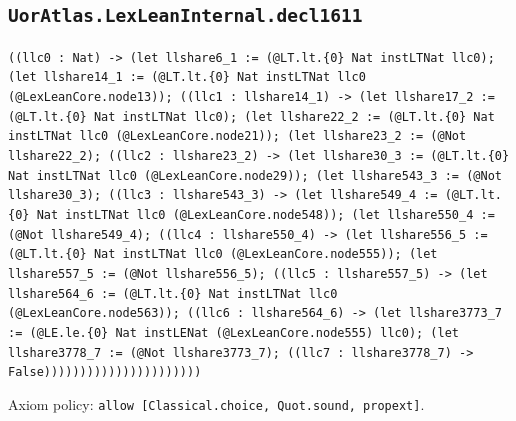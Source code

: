 \documentclass[11pt]{article}
\begin{document}
\subsection*{\texttt{UorAtlas.LexLeanInternal.decl1611}}
\noindent\texttt{((llc0 : Nat) -> (let llshare6\_1 := (@LT.lt.\{0\} Nat instLTNat llc0); (let llshare14\_1 := (@LT.lt.\{0\} Nat instLTNat llc0 (@LexLeanCore.node13)); ((llc1 : llshare14\_1) -> (let llshare17\_2 := (@LT.lt.\{0\} Nat instLTNat llc0); (let llshare22\_2 := (@LT.lt.\{0\} Nat instLTNat llc0 (@LexLeanCore.node21)); (let llshare23\_2 := (@Not llshare22\_2); ((llc2 : llshare23\_2) -> (let llshare30\_3 := (@LT.lt.\{0\} Nat instLTNat llc0 (@LexLeanCore.node29)); (let llshare543\_3 := (@Not llshare30\_3); ((llc3 : llshare543\_3) -> (let llshare549\_4 := (@LT.lt.\{0\} Nat instLTNat llc0 (@LexLeanCore.node548)); (let llshare550\_4 := (@Not llshare549\_4); ((llc4 : llshare550\_4) -> (let llshare556\_5 := (@LT.lt.\{0\} Nat instLTNat llc0 (@LexLeanCore.node555)); (let llshare557\_5 := (@Not llshare556\_5); ((llc5 : llshare557\_5) -> (let llshare564\_6 := (@LT.lt.\{0\} Nat instLTNat llc0 (@LexLeanCore.node563)); ((llc6 : llshare564\_6) -> (let llshare3773\_7 := (@LE.le.\{0\} Nat instLENat (@LexLeanCore.node555) llc0); (let llshare3778\_7 := (@Not llshare3773\_7); ((llc7 : llshare3778\_7) -> False))))))))))))))))))))))}\par
\noindent Axiom policy: \texttt{allow [Classical.choice, Quot.sound, propext]}.\par
\end{document}
